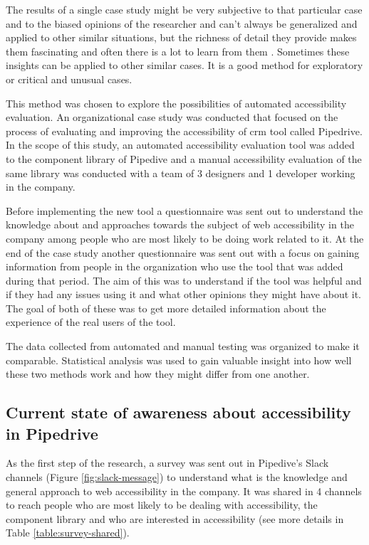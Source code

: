 \documentclass{master_thesis}
\begin{document}
The results of a single case study might be very subjective to that particular case and to the biased opinions of the researcher and can't always be generalized and applied to other similar situations, but the richness of detail they provide makes them fascinating and often there is a lot to learn from them \citep{Range2023}. Sometimes these insights can be applied to other similar cases. It is a good method for exploratory or critical and unusual cases.

This method was chosen to explore the possibilities of automated accessibility evaluation. An organizational case study was conducted that focused on the process of evaluating and improving the accessibility of \ac{crm} tool called Pipedrive. In the scope of this study, an automated accessibility evaluation tool was added to the component library of Pipedive and a manual accessibility evaluation of the same library was conducted with a team of 3 designers and 1 developer working in the company.

Before implementing the new tool a questionnaire was sent out to understand the knowledge about and approaches towards the subject of web accessibility in the company among people who are most likely to be doing work related to it. At the end of the case study another questionnaire was sent out with a focus on gaining information from people in the organization who use the tool that was added during that period. The aim of this was to understand if the tool was helpful and if they had any issues using it and what other opinions they might have about it. The goal of both of these was to get more detailed information about the experience of the real users of the tool.

The data collected from automated and manual testing was organized to make it comparable. Statistical analysis was used to gain valuable insight into how well these two methods work and how they might differ from one another.

\subsection{Current state of awareness about accessibility in Pipedrive}


As the first step of the research, a survey was sent out in Pipedive's Slack channels (Figure \ref{fig:slack-message}) to understand what is the knowledge and general approach to web accessibility in the company. It was shared in 4 channels to reach people who are most likely to be dealing with accessibility, the component library and who are interested in accessibility (see more details in Table \ref{table:survey-shared}).
\end{document}
